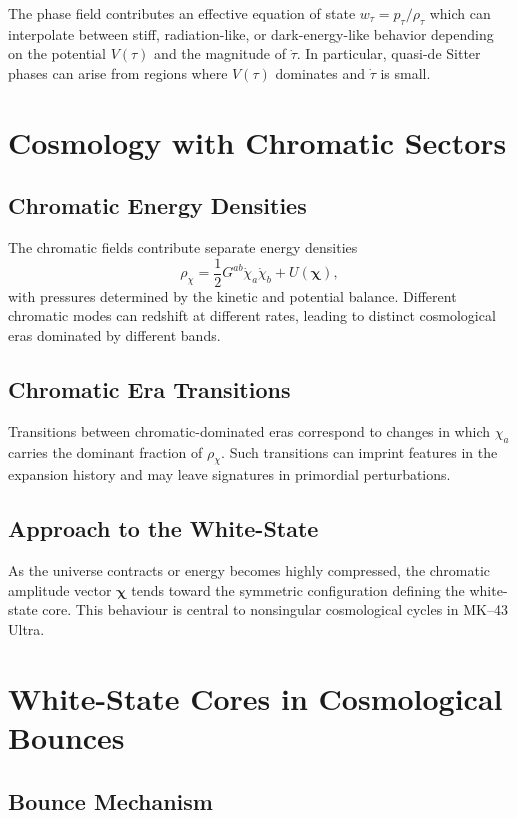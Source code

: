 The phase field contributes an effective equation of state $w_\tau = p_\tau/\rho_\tau$ which can interpolate between stiff, radiation-like, or dark-energy-like behavior depending on the potential $V(\tau)$ and the magnitude of $\dot{\tau}$.
In particular, quasi-de Sitter phases can arise from regions where $V(\tau)$ dominates and $\dot{\tau}$ is small.

\chapter{Cosmology with Chromatic Sectors}

\section{Chromatic Energy Densities}

The chromatic fields contribute separate energy densities
\[
  \rho_\chi =
  \frac{1}{2} G^{ab} \dot{\chi}_a \dot{\chi}_b + U(\bm{\chi}),
\]
with pressures determined by the kinetic and potential balance.
Different chromatic modes can redshift at different rates, leading to distinct cosmological eras dominated by different bands.

\section{Chromatic Era Transitions}

Transitions between chromatic-dominated eras correspond to changes in which $\chi_a$ carries the dominant fraction of $\rho_\chi$.
Such transitions can imprint features in the expansion history and may leave signatures in primordial perturbations.

\section{Approach to the White-State}

As the universe contracts or energy becomes highly compressed, the chromatic amplitude vector $\bm{\chi}$ tends toward the symmetric configuration defining the white-state core.
This behaviour is central to nonsingular cosmological cycles in MK--43 Ultra.

\chapter{White-State Cores in Cosmological Bounces}

\section{Bounce Mechanism}

